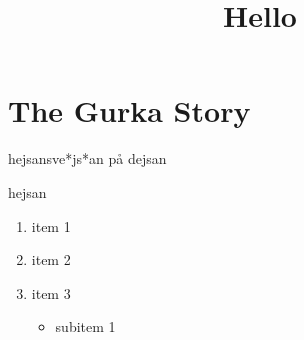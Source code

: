 

\title{Hello}
\section{The Gurka Story}
hejsansve*js*an på dejsan

\begin{Slide}
hejsan
\end{Slide}
\begin{enumerate}
\item item 1
\item item 2
\item item 3

\begin{itemize}
\item subitem 1
\end{itemize}
\end{enumerate}
